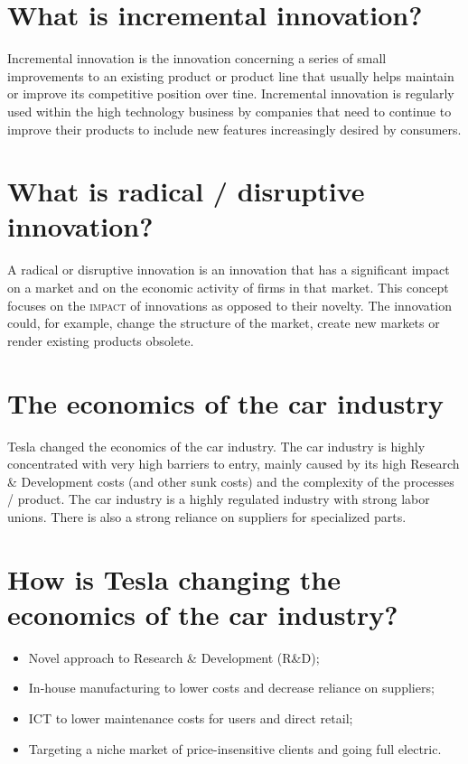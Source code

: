 \section{What is incremental innovation?}
Incremental innovation is the innovation concerning a series of small improvements to an existing product or product line that usually helps maintain or improve its competitive position over tine. Incremental innovation is regularly used within the high technology business by companies that need to continue to improve their products to include new features increasingly desired by consumers. 

\section{What is radical / disruptive innovation?}
A radical or disruptive innovation is an innovation that has a significant impact on a market and on the economic activity of firms in that market. This concept focuses on the \textsc{impact} of innovations as opposed to their novelty. The innovation could, for example, change the structure of the market, create new markets or render existing products obsolete.

\section{The economics of the car industry}
Tesla changed the economics of the car industry. The car industry is highly concentrated with very high barriers to entry, mainly caused by its high Research \& Development costs (and other sunk costs) and the complexity of the processes / product. The car industry is a highly regulated industry with strong labor unions. There is also a strong reliance on suppliers for specialized parts.

\section{How is Tesla changing the economics of the car industry?}
\begin{itemize}
\item Novel approach to Research \& Development (R\&D);
\item In-house manufacturing to lower costs and decrease reliance on suppliers;
\item ICT to lower maintenance costs for users and direct retail;
\item Targeting a niche market of price-insensitive clients and going full electric.
\end{itemize}

